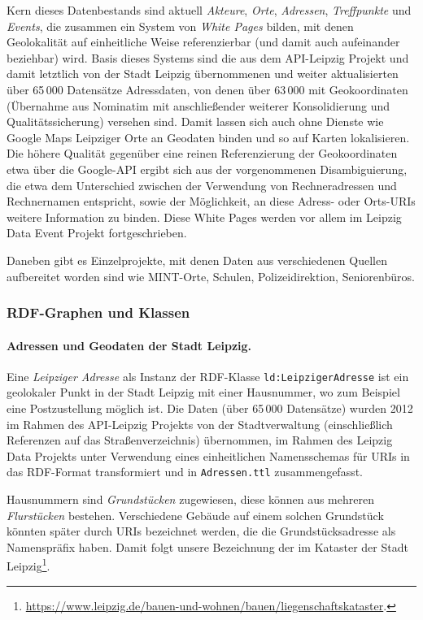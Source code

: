 \documentclass[a4paper,11pt]{article}
\begin{document}
Kern dieses Datenbestands sind aktuell \emph{Akteure}, \emph{Orte},
\emph{Adressen}, \emph{Treffpunkte} und \emph{Events}, die zusammen ein System
von \emph{White Pages} bilden, mit denen Geolokalität auf einheitliche Weise
referenzierbar (und damit auch aufeinander beziehbar) wird. Basis dieses
Systems sind die aus dem API-Leipzig Projekt und damit letztlich von der Stadt
Leipzig übernommenen und weiter aktualisierten über 65\,000 Datensätze
Adressdaten, von denen über 63\,000 mit Geokoordinaten (Übernahme aus
Nominatim mit anschließender weiterer Konsolidierung und Qualitätssicherung)
versehen sind. Damit lassen sich auch ohne Dienste wie Google Maps Leipziger
Orte an Geodaten binden und so auf Karten lokalisieren. Die höhere Qualität
gegenüber eine reinen Referenzierung der Geokoordinaten etwa über die
Google-API ergibt sich aus der vorgenommenen Disambiguierung, die etwa dem
Unterschied zwischen der Verwendung von Rechneradressen und Rechnernamen
entspricht, sowie der Möglichkeit, an diese Adress- oder Orts-URIs weitere
Information zu binden. Diese White Pages werden vor allem im Leipzig Data
Event Projekt fortgeschrieben.

Daneben gibt es Einzelprojekte, mit denen Daten aus verschiedenen Quellen
aufbereitet worden sind wie MINT-Orte, Schulen, Polizeidirektion,
Seniorenbüros.

\subsubsection*{RDF-Graphen und Klassen}

\paragraph{Adressen und Geodaten der Stadt Leipzig.} 
Eine \emph{Leipziger Adresse} als Instanz der RDF-Klasse
\texttt{ld:LeipzigerAdresse} ist ein geolokaler Punkt in der Stadt Leipzig mit
einer Hausnummer, wo zum Beispiel eine Postzustellung möglich ist. Die Daten
(über 65\,000 Datensätze) wurden 2012 im Rahmen des API-Leipzig Projekts von
der Stadtverwaltung (einschließlich Referenzen auf das Straßenverzeichnis)
übernommen, im Rahmen des Leipzig Data Projekts unter Verwendung eines
einheitlichen Namensschemas für URIs in das RDF-Format transformiert und in
\texttt{Adressen.ttl} zusammengefasst.

Hausnummern sind \emph{Grundstücken} zugewiesen, diese können aus mehreren
\emph{Flurstücken} bestehen. Verschiedene Gebäude auf einem solchen Grundstück
könnten später durch URIs bezeichnet werden, die die Grundstücksadresse als
Namenspräfix haben. Damit folgt unsere Bezeichnung der im Kataster der Stadt
Leipzig\footnote{\url{https://www.leipzig.de/bauen-und-wohnen/bauen/liegenschaftskataster}.}.
\end{document}
